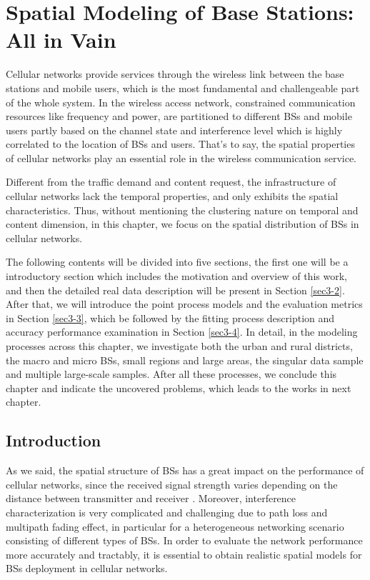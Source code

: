 \chapter{Spatial Modeling of Base Stations: All in Vain} %
\minitoc
\label{Chapter3} %

Cellular networks provide services through the wireless link between the base stations and mobile users, which is the most fundamental and challengeable part of the whole system. In the wireless access network, constrained communication resources like frequency and power, are partitioned to different BSs and mobile users partly based on the channel state and interference level which is highly correlated to the location of BSs and users. That's to say, the spatial properties of cellular networks play an essential role in the wireless communication service.

Different from the traffic demand and content request, the infrastructure of cellular networks lack the temporal properties, and only exhibits the spatial characteristics. Thus, without mentioning the clustering nature on temporal and content dimension, in this chapter, we focus on the spatial distribution of BSs in cellular networks.

The following contents will be divided into five sections, the first one will be a introductory section which includes the motivation and overview of this work, and then the detailed real data description will be present in Section \ref{sec3-2}. After that, we will introduce the point process models and the evaluation metrics in Section \ref{sec3-3}, which be followed by the fitting process description and accuracy performance examination in Section \ref{sec3-4}. In detail, in the modeling processes across this chapter, we investigate both the urban and rural districts, the macro and micro BSs, small regions and large areas, the singular data sample and multiple large-scale samples. After all these processes, we conclude this chapter and indicate the uncovered problems, which leads to the works in next chapter.
\section{Introduction} \label{sec3-1}
As we said, the spatial structure of BSs has a great impact on the performance of cellular networks, since the received signal strength varies depending on the distance between transmitter and receiver \cite{haenggi2009stochastic}. Moreover, interference characterization is very complicated and challenging due to path loss and multipath fading effect, in particular for a heterogeneous networking scenario consisting of different types of BSs. In order to evaluate the network performance more accurately and tractably, it is essential to obtain realistic spatial models for BSs deployment in cellular networks\cite{andrews2010primer}.


